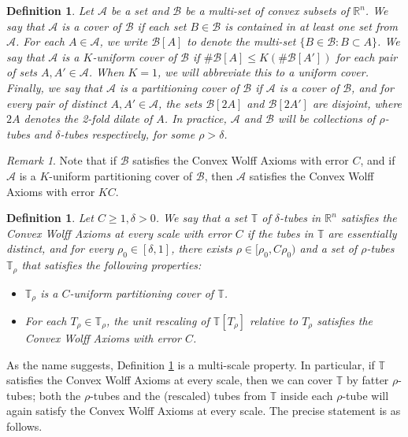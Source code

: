 \documentclass[letterpaper, reqno,11pt]{article}
\numberwithin{equation}{section}
\newcommand{\RR}{\mathbb{R}}
\newcommand{\tubes}{\mathbb{T}}
\numberwithin{thm}{section}
\newtheorem{defn}[thm]{Definition}
\theoremstyle{remark}
\newtheorem{rem}[thm]{Remark}
\begin{document}
\begin{defn}\label{coversDefn}
Let $\mathcal{A}$ be a set and $\mathcal{B}$ be a multi-set of convex subsets of $\RR^n$. We say that \emph{$\mathcal{A}$ is a cover of $\mathcal{B}$} if each set $B\in\mathcal{B}$ is contained in at least one set from $\mathcal{A}$. For each $A\in\mathcal{A}$, we write $\mathcal{B}[A]$ to denote the multi-set $\{B\in\mathcal{B}\colon B \subset A\}$. We say that $\mathcal{A}$ is a \emph{$K$-uniform cover} of $\mathcal{B}$ if $\# \mathcal{B}[A]\leq K (\#\mathcal{B}[A'])$ for each pair of sets $A,A'\in\mathcal{A}$. When $K=1$, we will abbreviate this to a \emph{uniform cover}. Finally, we say that $\mathcal{A}$ is a \emph{partitioning cover} of $\mathcal{B}$ if $\mathcal{A}$ is a cover of $\mathcal{B}$, and for every pair of distinct $A,A'\in\mathcal{A}$, the sets $\mathcal{B}[2A]$ and $\mathcal{B}[2A']$ are disjoint, where $2A$ denotes the 2-fold dilate of $A$.  In practice, $\mathcal{A}$ and $\mathcal{B}$ will be collections of $\rho$-tubes and $\delta$-tubes respectively, for some $\rho>\delta$. 
\end{defn}


\begin{rem}\label{consequenceOFUnifCover}
Note that if $\mathcal{B}$ satisfies the Convex Wolff Axioms with error $C$, and if $\mathcal{A}$ is a $K$-uniform partitioning cover of $\mathcal{B}$, then $\mathcal{A}$ satisfies the Convex Wolff Axioms with error $KC$. 
\end{rem}



\begin{defn}\label{convexAtEveryScale}
Let $C\geq 1,\delta>0$. We say that a set $\tubes$ of $\delta$-tubes in $\RR^n$ satisfies the \emph{Convex Wolff Axioms at every scale with error $C$} if the tubes in $\tubes$ are essentially distinct, and for every $\rho_0\in [\delta,1]$, there exists $\rho\in [\rho_0, C\rho_0)$ and a set of $\rho$-tubes $\tubes_\rho$ that satisfies the following properties:
\begin{itemize}
	\item[(i)] $\tubes_\rho$ is a $C$-uniform partitioning cover of $\tubes$.
	\item[(ii)] For each $T_\rho\in\tubes_\rho$, the unit rescaling of $\tubes[T_\rho]$ relative to $T_\rho$ satisfies the Convex Wolff Axioms with error $C$.
\end{itemize}
\end{defn}

As the name suggests, Definition \ref{convexAtEveryScale} is a multi-scale property. In particular, if $\tubes$ satisfies the Convex Wolff Axioms at every scale, then we can cover $\tubes$ by fatter $\rho$-tubes; both the $\rho$-tubes and the (rescaled) tubes from $\tubes$ inside each $\rho$-tube will again satisfy the Convex Wolff Axioms at every scale. The precise statement is as follows. 
\end{document}
